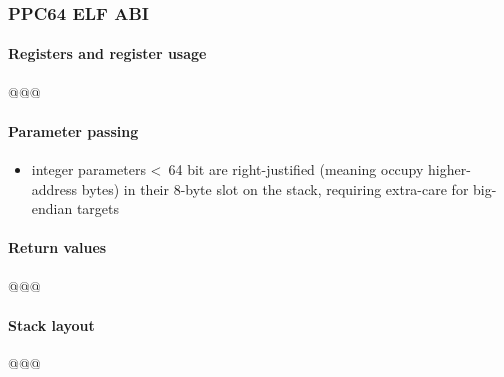 \subsubsection{PPC64 ELF ABI}

\paragraph{Registers and register usage}

@@@


\paragraph{Parameter passing}

\begin{itemize}
@@@
\item integer parameters \textless\ 64 bit are right-justified (meaning occupy higher-address bytes) in their 8-byte slot on the stack, requiring extra-care for big-endian targets
\end{itemize}


\paragraph{Return values}

@@@


\paragraph{Stack layout}

@@@

